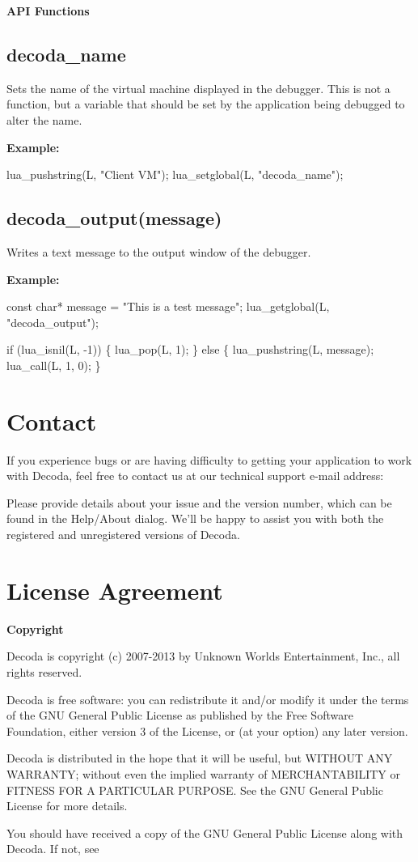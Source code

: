 \textbf{API Functions}

\section{decoda_name}\label{decoda_name}

Sets the name of the virtual machine displayed in the debugger. This is not a function, but
a variable that should be set by the application being debugged to alter the name.

\textbf{Example:}

{\verbatim lua_pushstring(L, "Client VM");
lua_setglobal(L, "decoda_name"); }

\section{decoda_output(message)}\label{decoda_output}

Writes a text message to the output window of the debugger.

\textbf{Example:}

{\verbatim const char* message = "This is a test message";
lua_getglobal(L, "decoda_output");

if (lua_isnil(L, -1))
\{
    lua_pop(L, 1);
\}
else
\{
    lua_pushstring(L, message);
    lua_call(L, 1, 0);
\}
}

\chapter{Contact}\label{contact}

If you experience bugs or are having difficulty to getting your application
to work with Decoda, feel free to contact us at our technical support e-mail
address:


Please provide details about your issue and the version number, which can be
found in the Help/About dialog. We'll be happy to assist you with both the
registered and unregistered versions of Decoda.

\chapter{License Agreement}\label{license}

\textbf{Copyright}

Decoda is copyright (c) 2007-2013 by Unknown Worlds Entertainment, Inc., all
rights reserved.

Decoda is free software: you can redistribute it and/or modify
it under the terms of the GNU General Public License as published by
the Free Software Foundation, either version 3 of the License, or
(at your option) any later version.

Decoda is distributed in the hope that it will be useful,
but WITHOUT ANY WARRANTY; without even the implied warranty of
MERCHANTABILITY or FITNESS FOR A PARTICULAR PURPOSE.  See the
GNU General Public License for more details.

You should have received a copy of the GNU General Public License
along with Decoda.  If not, see 


